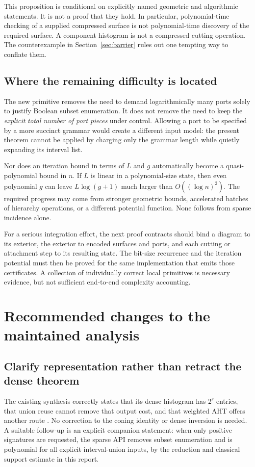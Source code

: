 \documentclass[11pt,letterpaper]{article}
\theoremstyle{definition}
\begin{document}
This proposition is conditional on explicitly named geometric and
algorithmic statements. It is not a proof that they hold. In particular,
polynomial-time checking of a supplied compressed surface is not
polynomial-time discovery of the required surface. A component histogram
is not a compressed cutting operation. The counterexample in
Section~\ref{sec:barrier} rules out one tempting way to conflate them.

\subsection{Where the remaining difficulty is located}
The new primitive removes the need to demand logarithmically many ports
solely to justify Boolean subset enumeration. It does not remove the need
to keep the \emph{explicit total number of port pieces} under control.
Allowing a port to be specified by a more succinct grammar would create a
different input model: the present theorem cannot be applied by charging
only the grammar length while quietly expanding its interval list.

Nor does an iteration bound in terms of $L$ and $g$ automatically become a
quasi-polynomial bound in $n$. If $L$ is linear in a polynomial-size state,
then even polynomial $g$ can leave $L\log(g+1)$ much larger than
$O((\log n)^2)$. The required progress may come from stronger geometric
bounds, accelerated batches of hierarchy operations, or a different
potential function. None follows from sparse incidence alone.

For a serious integration effort, the next proof contracts should bind a
diagram to its exterior, the exterior to encoded surfaces and ports, and
each cutting or attachment step to its resulting state. The bit-size
recurrence and the iteration potential must then be proved for the same
implementation that emits those certificates. A collection of individually
correct local primitives is necessary evidence, but not sufficient
end-to-end complexity accounting.

\section{Recommended changes to the maintained analysis}\label{sec:integration}

\subsection{Clarify representation rather than retract the dense theorem}
The existing synthesis correctly states that its dense histogram has
$2^r$ entries, that union reuse cannot remove that output cost, and that
weighted AHT offers another route \cite{repo-certificates}. No correction
to the coning identity or dense inversion is needed. A suitable follow-up
is an explicit companion statement: when only positive signatures are
requested, the sparse API removes subset enumeration and is polynomial
for all explicit interval-union inputs, by the reduction and classical
support estimate in this report.
\end{document}
